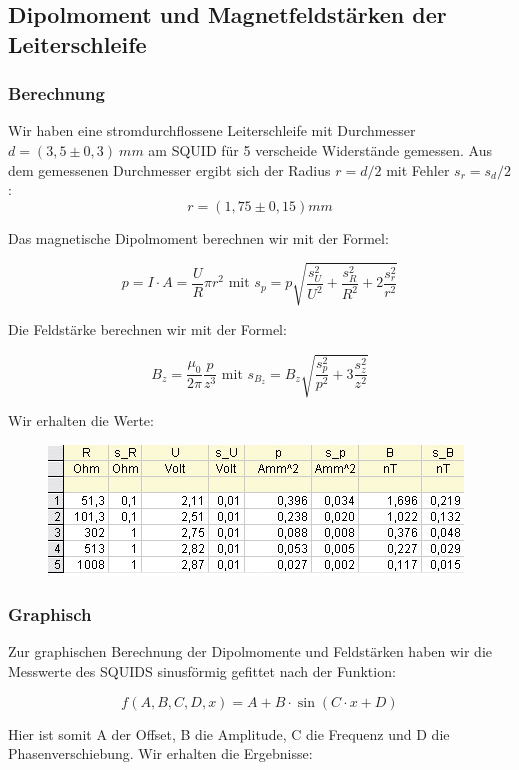 \subsection{Dipolmoment und Magnetfeldstärken der Leiterschleife}

\subsubsection{Berechnung}

Wir haben eine stromdurchflossene Leiterschleife mit Durchmesser $d = (3,5 \pm 0,3)\ mm$ am SQUID für 5 verscheide Widerstände gemessen. Aus dem gemessenen Durchmesser ergibt sich der Radius $r=d/2$ mit Fehler $s_r = s_d/2$: $$r = (1,75 \pm 0,15) mm$$

Das magnetische Dipolmoment berechnen wir mit der Formel:

$$p = I\cdot A = \frac{U}{R}\pi r^2 \text{ \ \ \ mit \ \ \ } s_p = p\sqrt{\frac{s_U^2}{U^2} + \frac{s_R^2}{R^2} + 2\frac{s_r^2}{r^2}}$$

Die Feldstärke berechnen wir mit der Formel:

$$B_z = \frac{\mu_0}{2\pi}\frac{p}{z^3} \text{ \ \ \ mit \ \ \ } s_{B_z}=B_z\sqrt{\frac{s_p^2}{p^2} + 3 \frac{s_z^2}{z^2}}$$

Wir erhalten die Werte:

\begin{figure}[H]
	\centering \includegraphics{Bilder/Tab-Leiterschleife.jpg}
\end{figure}

\subsubsection{Graphisch}

Zur graphischen Berechnung der Dipolmomente und Feldstärken haben wir die Messwerte des SQUIDS sinusförmig gefittet nach der Funktion:

$$ f(A,B,C,D,x) = A + B\cdot\sin(C\cdot x + D) $$

Hier ist somit A der Offset, B die Amplitude, C die Frequenz und D die Phasenverschiebung. Wir erhalten die Ergebnisse:

